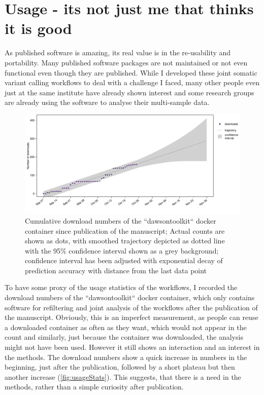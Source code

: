 \section[Usage]{Usage - its not just me that thinks it is good}
As published software is amazing, its real value is in the re-usability and portability. Many published software packages are not maintained or not even functional even though they are published. While I developed these joint somatic variant calling workflows to deal with a challenge I faced, many other people even just at the same institute have already shown interest and some research groups are already using the software to analyse their multi-sample data.

\begin{figure}[!ht]
\centering
\includegraphics[width=.99\linewidth]{Figures/dawsontoolkitDownloads.pdf}
\caption[Usage statistics joint workflows]{Cumulative download numbers of the ``dawsontoolkit`` docker container since publication of the manuscript; Actual counts are shown as dots, with smoothed trajectory depicted as dotted line with the 95\% confidence interval shown as a grey background; confidence interval has been adjusted with exponential decay of prediction accuracy with distance from the last data point}\label{fig:usageStats}
\end{figure}

To have some proxy of the usage statistics of the workflows, I recorded the download numbers of the ``dawsontoolkit`` docker container, which only contains software for refiltering and joint analysis of the workflows after the publication of the manuscript. Obviously, this is an imperfect measurement, as people can reuse a downloaded container as often as they want, which would not appear in the count and similarly, just because the container was downloaded, the analysis might not have been used. However it still shows  an interaction and an interest in the methods. The download numbers show a quick increase in numbers in the beginning, just after the publication, followed by a short plateau  but then another increase (\autoref{fig:usageStats}). This suggests, that there is a need in the methods, rather than a simple curiosity after publication. 

